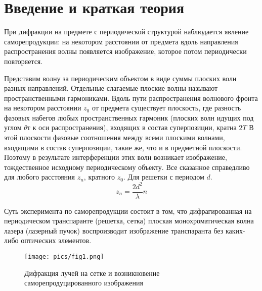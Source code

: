 
\section{Введение и краткая теория}
При дифракции на предмете с периодической структурой наблюдается явление саморепродукции: на некотором расстоянии от предмета вдоль направления распространения волны появляется изображение, которое потом периодически повторяется.  \par
Представим волну за периодическим объектом в виде суммы плоских волн разных направлений. Отдельные слагаемые плоские волны называют пространственными гармониками. Вдоль пути распространения волнового фронта на некотором расстоянии $z_0$ от предмета существует плоскость, где разность фазовых набегов любых пространственных гармоник (плоских волн идущих под углом $\theta$т к оси распространения), входящих в состав суперпозиции, кратна $2T$ В этой плоскости фазовые соотношения между всеми плоскими волнами, входящими в состав суперпозиции, такие же, что и в предметной плоскости. Поэтому в результате интерференции этих волн возникает изображение, тождественное исходному периодическому объекту. Все сказанное справедливо для любого расстояния $z_n$, кратного $z_0$. Для решетки с периодом $d$.
\begin{equation}
    z_n = \frac{2d^2}{\lambda}n
\end{equation}

Суть эксперимента по саморепродукции состоит в том, что дифрагированная на периодическом транспаранте (решетка, сетка) плоская монохроматическая волна лазера (лазерный пучок) воспроизводит изображение транспаранта без каких-либо оптических элементов.

\begin{figure}[h!]
    \centering
    \texttt{[image: pics/fig1.png]}
    \caption{Дифракция лучей на сетке и возникновение саморепродуцированного изображения}
    \label{fig:vac}
\end{figure}
